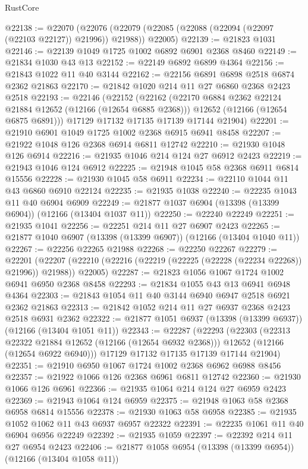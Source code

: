\begin{lexlean}{RustCore}
\begin{coremodule}
@22138 := @22070
    (@22076 (@22079 (@22085 (@22088 (@22094 (@22097 (@22103 @22127)) @21996)) @21988)) @22005)
@22139 := @21823 @1031
@22146 := @22139 @1049 @1725 @1002 @6892 @6901 @2368 @8460
@22149 := @21834 @1030 @43 @13
@22152 := @22149 @6892 @6899 @4364
@22156 := @21843 @1022 @11 @40 @3144
@22162 := @22156 @6891 @6898 @2518 @6874 @2362 @21863
@22170 := @21842 @1020 @214 @11 @27 @6860 @2368 @2423 @2518
@22193 := @22146
    (@22152
      (@22162
        (@22170 @6884 @2362 @22124 @21884 @12652 (@12166 (@12654 @6885 @2368)))
        @12652
        (@12166 (@12654 @6875 @6891)))
      @17129
      @17132
      @17135
      @17139
      @17144
      @21904)
@22201 := @21910 @6901 @1049 @1725 @1002 @2368 @6915 @6941 @8458
@22207 := @21922 @1048 @126 @2368 @6914 @6811 @12742
@22210 := @21930 @1048 @126 @6914
@22216 := @21935 @1046 @214 @124 @27 @6912 @2423
@22219 := @21943 @1046 @124 @6912
@22225 := @21948 @1045 @58 @2368 @6911 @6814 @15556
@22228 := @21930 @1045 @58 @6911
@22234 := @22110 @1044 @11 @43 @6860 @6910 @22124
@22235 := @21935 @1038
@22240 := @22235 @1043 @11 @40 @6904 @6909
@22249 := @21877 @1037 @6904 (@13398 (@13399 @6904)) (@12166 (@13404 @1037 @11))
@22250 := @22240 @22249
@22251 := @21935 @1041
@22256 := @22251 @214 @11 @27 @6907 @2423
@22265 := @21877 @1040 @6907 (@13398 (@13399 @6907)) (@12166 (@13404 @1040 @11))
@22267 := @22256 @22265 @21988
@22268 := @22250 @22267
@22279 := @22201
    (@22207 (@22210 (@22216 (@22219 (@22225 (@22228 (@22234 @22268)) @21996)) @21988)) @22005)
@22287 := @21823 @1056 @1067 @1724 @1002 @6941 @6950 @2368 @8458
@22293 := @21834 @1055 @43 @13 @6941 @6948 @4364
@22303 := @21843 @1054 @11 @40 @3144 @6940 @6947 @2518 @6921 @2362 @21863
@22313 := @21842 @1052 @214 @11 @27 @6937 @2368 @2423 @2518 @6931 @2362
@22322 := @21877 @1051 @6937 (@13398 (@13399 @6937)) (@12166 (@13404 @1051 @11))
@22343 := @22287
    (@22293
      (@22303
        (@22313 @22322 @21884 @12652 (@12166 (@12654 @6932 @2368)))
        @12652
        (@12166 (@12654 @6922 @6940)))
      @17129
      @17132
      @17135
      @17139
      @17144
      @21904)
@22351 := @21910 @6950 @1067 @1724 @1002 @2368 @6962 @6988 @8456
@22357 := @21922 @1066 @126 @2368 @6961 @6811 @12742
@22360 := @21930 @1066 @126 @6961
@22366 := @21935 @1064 @214 @124 @27 @6959 @2423
@22369 := @21943 @1064 @124 @6959
@22375 := @21948 @1063 @58 @2368 @6958 @6814 @15556
@22378 := @21930 @1063 @58 @6958
@22385 := @21935 @1052 @1062 @11 @43 @6937 @6957 @22322
@22391 := @22235 @1061 @11 @40 @6904 @6956 @22249
@22392 := @21935 @1059
@22397 := @22392 @214 @11 @27 @6954 @2423
@22406 := @21877 @1058 @6954 (@13398 (@13399 @6954)) (@12166 (@13404 @1058 @11))

\end{coremodule}
\end{lexlean}
